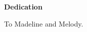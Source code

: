\newpage
{}
\begin{center}
\textbf{Dedication}

\vspace{0.2in}
To Madeline and Melody.
\end{center}
